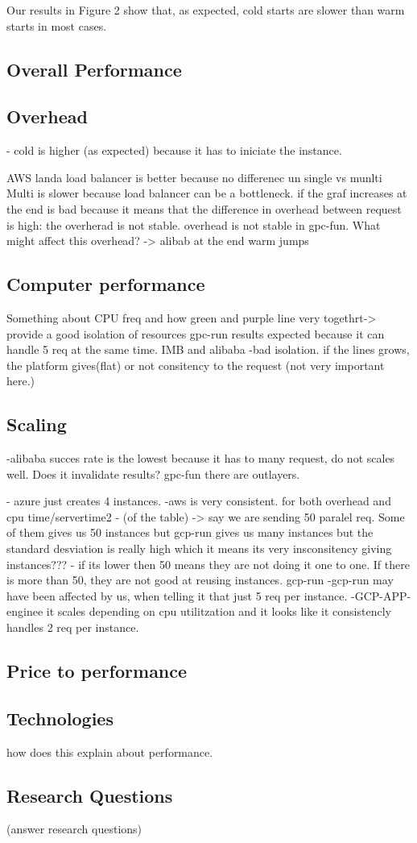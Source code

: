 \documentclass[11pt]{article}
\begin{document}
Our results in Figure 2 %
show that, as expected, cold starts are slower than warm starts in most cases.


\subsection{Overall Performance}

\subsection{Overhead}
- cold is higher (as expected) because it has to iniciate the instance.


AWS landa load balancer is better because no differenec un single vs munlti
Multi is slower because load balancer can be a bottleneck.
if the graf increases at the end is bad because it means that the difference in overhead between request is high: the overherad is not stable. overhead is not stable in gpc-fun.
What might affect this overhead? ->
alibab at the end warm jumps


\subsection{Computer performance}
Something about CPU freq and how
green and purple line very togethrt-> provide a good isolation of resources
gpc-run results expected because it can handle 5 req at the same time.
IMB and alibaba -bad isolation.
if the lines grows, the platform gives(flat) or not consitency to the request (not very important here.)



\subsection{Scaling}

-alibaba succes rate is the lowest because it has to many request, do not scales well. Does it invalidate results?
gpc-fun there are outlayers.

- azure just creates 4 instances.
-aws is very consistent. for both overhead and cpu time/servertime2
- (of the table) -> say we are sending 50 paralel req. Some of them gives us 50 instances but gcp-run gives us many instances but the standard desviation is really high which it means its very insconsitency giving instances???
- if its lower then 50 means they are not doing it one to one. If there is more than 50, they are not good at reusing instances. gcp-run
-gcp-run may have been affected by us, when telling it that just 5 req per instance.
-GCP-APP-enginee it scales depending on cpu utilitzation and it looks like it consistencly handles 2 req per instance.

\subsection{Price to performance}


\subsection{Technologies}
how does this explain about performance.

\subsection{Research Questions}
(answer research questions)




\end{document}
